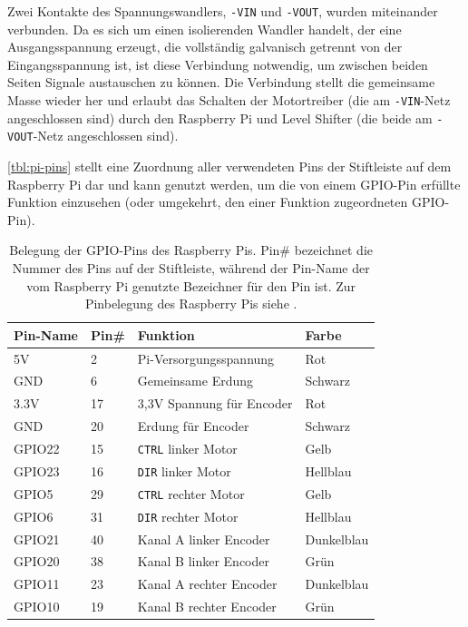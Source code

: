\documentclass[german]{thesis_KBS}
\newcommand{\code}[1]{\texttt{#1}}  %
\begin{document}
Zwei Kontakte des Spannungswandlers, \code{-VIN} und \code{-VOUT}, wurden
miteinander verbunden. Da es sich um einen isolierenden Wandler handelt, der
eine Ausgangsspannung erzeugt, die vollständig galvanisch getrennt von der
Eingangsspannung ist, ist diese Verbindung notwendig, um zwischen beiden Seiten
Signale austauschen zu können. Die Verbindung stellt die gemeinsame Masse wieder
her und erlaubt das Schalten der Motortreiber (die am \code{-VIN}-Netz
angeschlossen sind) durch den Raspberry Pi und Level Shifter (die beide am
\code{-VOUT}-Netz angeschlossen sind).

\autoref{tbl:pi-pins} stellt eine Zuordnung aller verwendeten Pins der
Stiftleiste auf dem Raspberry Pi dar und kann genutzt werden, um die von einem
GPIO-Pin erfüllte Funktion einzusehen (oder umgekehrt, den einer Funktion
zugeordneten GPIO-Pin).

\begin{table}
    \centering
    \begin{tabular}{|l|l|l|l|}
        Pin-Name & Pin\# & Funktion                  & Farbe      \\ \hline
        5V       & 2     & Pi-Versorgungsspannung    & Rot        \\
        GND      & 6     & Gemeinsame Erdung         & Schwarz    \\
        3.3V     & 17    & 3,3V Spannung für Encoder & Rot        \\
        GND      & 20    & Erdung für Encoder        & Schwarz    \\
        GPIO22   & 15    & \code{CTRL} linker Motor  & Gelb       \\
        GPIO23   & 16    & \code{DIR} linker Motor   & Hellblau   \\
        GPIO5    & 29    & \code{CTRL} rechter Motor & Gelb       \\
        GPIO6    & 31    & \code{DIR} rechter Motor  & Hellblau   \\
        GPIO21   & 40    & Kanal A linker Encoder    & Dunkelblau \\
        GPIO20   & 38    & Kanal B linker Encoder    & Grün       \\
        GPIO11   & 23    & Kanal A rechter Encoder   & Dunkelblau \\
        GPIO10   & 19    & Kanal B rechter Encoder   & Grün       \\
    \end{tabular}
    \caption{
        Belegung der GPIO-Pins des Raspberry Pis. Pin\# bezeichnet die Nummer
        des Pins auf der Stiftleiste, während der Pin-Name der vom Raspberry Pi
        genutzte Bezeichner für den Pin ist. Zur Pinbelegung des Raspberry Pis
        siehe \cite{pi-gpio-pinout}.
    }
    \label{tbl:pi-pins}
\end{table}
\end{document}
